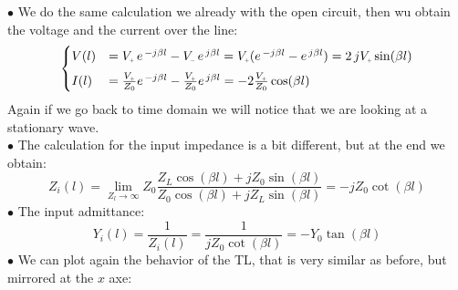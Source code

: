 $\bullet$ We do the same calculation we already with the open circuit, then wu obtain the voltage and the current over the line:
\begin{equation}
    \begin{cases}
      V(l)&=V\bottomPlus\,e^{\,-j\beta l}-V\bottomMinus\,e^{\,j\beta l}=V\bottomPlus(e^{\,-j\beta l}-e^{\,j\beta l})=2\,jV\bottomPlus\sin (\beta l)\\[5pt]
      I(l)&=\frac{V\bottomPlus}{Z_0}e^{\,-j\beta l}-\frac{V\bottomPlus}{Z_0}e^{\,j\beta l}=-2\frac{V\bottomPlus}{Z_0}\cos (\beta l)
    \end{cases}
\end{equation}
Again if we go back to time domain we will notice that we are looking at a stationary wave.\\
$\bullet$ The calculation for the input impedance is a bit different, but at the end we obtain:
\begin{equation}\label{eq:open_circuit_TL}
    Z_i(l)=\lim_{Z_l\rightarrow\infty} Z_0\frac{Z_L\cos(\beta l)+jZ_0 \sin(\beta l)}{Z_0\cos(\beta l)+jZ_L\sin(\beta l)}=-jZ_0\cot(\beta l)
\end{equation}
$\bullet$ The input admittance:
\begin{equation}\label{input_admittance_of_a_short}
    Y_i(l)=\frac{1}{Z_i(l)}=\frac{1}{jZ_0\cot(\beta l)}=-Y_0\tan(\beta l)
\end{equation}
$\bullet$ We can plot again the behavior of the TL, that is very similar as before, but mirrored at the $x$ axe:

